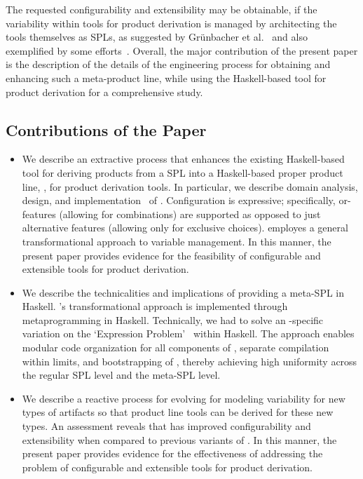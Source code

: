 

The requested configurability and extensibility may be obtainable, if the variability within tools for product derivation is managed by architecting the tools themselves as SPLs, as suggested by Gr{\"u}nbacher et al.~\cite{grunbacher:2008} and also exemplified by some efforts~\cite{grunbacher:2011,batory-ahead-bootstrap}. Overall, the major contribution of the present paper is the description of the details of the engineering process for obtaining and enhancing such a meta-product line, while using the Haskell-based \hp{} tool for product derivation for a comprehensive study.


\subsection*{Contributions of the Paper}

\begin{itemize}

\item We describe an extractive process that enhances the existing Haskell-based tool \hp{} for deriving products from a SPL into a Haskell-based proper product line, \hpl, for product derivation tools. In particular, we describe domain analysis, design, and implementation~\cite{gpbook} of \hpl. Configuration is expressive; specifically, or-features (allowing for combinations) are supported as opposed to just alternative features (allowing only for exclusive choices). \hpl{} employes a general transformational approach to variable management. In this manner, the present paper provides evidence for the feasibility of configurable and extensible tools for product derivation.

\item We describe the technicalities and implications of providing a meta-SPL in Haskell. \hpl's transformational approach is implemented through metaprogramming in Haskell. Technically, we had to solve an \hp-specific variation on the `Expression Problem'~\cite{Wadler98,Lopez-HerrejonBC05} within Haskell. The approach enables modular code organization for all components of \hpl, separate compilation within limits, and bootstrapping of \hpl, thereby achieving high uniformity across the regular SPL level and the meta-SPL level.

\item We describe a reactive process for evolving \hpl{} for modeling variability for new types of artifacts so that product line tools can be derived for these new types. An assessment reveals that \hpl{} has improved configurability and extensibility when compared to previous variants of \hp. In this manner, the present paper provides evidence for the effectiveness of addressing the problem of configurable and extensible tools for product derivation.

\end{itemize}

